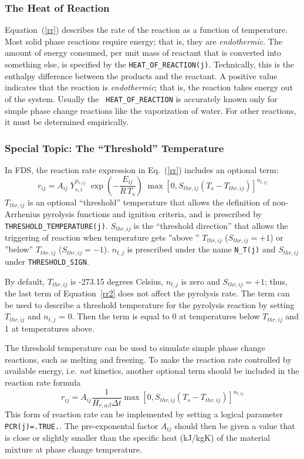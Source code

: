 \documentclass[11pt]{book}
\newcommand{\ct}{\tt\small}
\newcommand{\be}{\begin{equation}}
\newcommand{\ee}{\end{equation}}
\begin{document}
\subsubsection{The Heat of Reaction}

Equation~(\ref{rr}) describes the rate of the reaction as a function
of temperature.  Most solid phase reactions require energy; that is,
they are {\em endothermic}. The amount of energy consumed, per unit
mass of reactant that is converted into something else, is specified
by the {\ct HEAT\_OF\_REACTION(j)}. Technically, this is the enthalpy
difference between the products and the reactant. A positive value
indicates that the reaction is {\em endothermic}; that is, the
reaction takes energy out of the system. Usually the {\ct
HEAT\_OF\_REACTION} is accurately known only for simple phase change
reactions like the vaporization of water. For other reactions, it must
be determined empirically.


\subsubsection{Special Topic: The ``Threshold'' Temperature}

In FDS, the reaction rate expression in Eq.~(\ref{rr}) includes an optional term:
\be
  r_{ij} = A_{ij} \; Y_{s,i}^{n_{s,ij}} \; \exp \left(-\frac{E_{ij}}{R \, T_s} \right) \;
  \max\left[0,S_{thr,ij}(T_s-T_{thr,ij})\right]^{n_{t,ij}}
  \label{rr2}
\ee
$T_{thr,ij}$ is an optional ``threshold'' temperature that
allows the definition of non-Arrhenius pyrolysis functions and
ignition criteria, and is prescribed by {\ct THRESHOLD\_TEMPERATURE(j)}.
$S_{thr,ij}$ is the ``threshold direction'' that allows the triggering of reaction
when temperature gets ''above '' $T_{thr,ij}$ ($S_{thr,ij}=+1$) or ''below'' $T_{thr,ij}$ ($S_{thr,ij}=-1$).
$n_{t,j}$ is prescribed under the name {\ct N\_T(j)} and $S_{thr,ij}$ under {\ct THRESHOLD\_SIGN}.

By default, $T_{thr,ij}$ is -273.15 degrees Celsius, $n_{t,j}$ is zero and $S_{thr,ij}=+1$;
thus, the last term of Equation~\ref{rr2} does not affect the pyrolysis rate.
The term can be used to describe a threshold temperature for the pyrolysis
reaction by setting $T_{thr,ij}$ and $n_{t,j}$ = 0. Then the term
is equal to 0 at temperatures below $T_{thr,ij}$ and 1 at temperatures above.

The threshold temperature can be used to simulate simple phase change reactions, such as melting and freezing.
To make the reaction rate controlled by available energy, i.e. {\em not} kinetics, another optional term should be included
in the reaction rate formula
\be
  r_{ij} = A_{ij}\frac{1}{H_{r,\alpha\beta}\Delta t} \max\left[0,S_{thr,ij}(T_s-T_{thr,ij})\right]^{n_{t,ij}}
  \label{rr3}
\ee
This form of reaction rate can be implemented by setting a logical parameter {\ct PCR(j)=.TRUE.}. The pre-exponental
factor $A_{ij}$ should then be given a value that is close or slightly smaller than the specific heat (kJ/kgK) of the material mixture at
phase change temperature.
\end{document}
